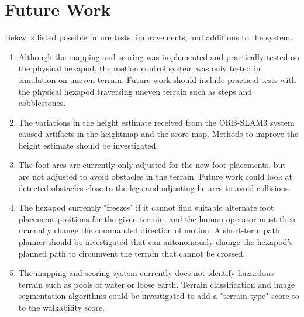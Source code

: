 


    \section{Future Work}
        Below is listed possible future tests, improvements, and additions to the system.

        \begin{enumerate}
            \item Although the mapping and scoring was implemented and practically tested on the physical hexapod, the motion control system was only tested in simulation on uneven terrain. Future work should include practical tests with the physical hexapod traversing uneven terrain such as steps and cobblestones.            
            \item The variations in the height estimate received from the ORB-SLAM3 system caused artifacts in the heightmap and the score map. Methods to improve the height estimate should be investigated.
            \item The foot arcs are currently only adjusted for the new foot placements, but are not adjusted to avoid obstacles in the terrain. Future work could look at detected obstacles close to the legs and adjusting he arcs to avoid collisions.
            \item The hexapod currently "freezes" if it cannot find suitable alternate foot placement positions for the given terrain, and the human operator must then manually change the commanded direction of motion. A short-term path planner should be investigated that can autonomously change the hexapod's planned path to circumvent the terrain that cannot be crossed.
            \item The mapping and scoring system currently does not identify hazardous terrain such as pools of water or loose earth. Terrain classification and image segmentation algorithms could be investigated to add a "terrain type" score to to the walkability score.

            
        \end{enumerate}